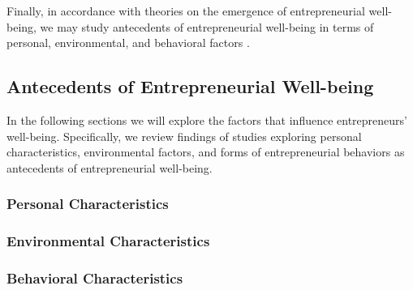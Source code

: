 \documentclass[a4paper,man,noextraspace,natbib]{apa6}
\begin{document}
Finally, in accordance with theories on the emergence of entrepreneurial well-being, we may study antecedents of entrepreneurial well-being in terms of personal, environmental, and behavioral factors \citep{Diener2002}.

\subsection{Antecedents of Entrepreneurial Well-being}
In the following sections we will explore the factors that influence entrepreneurs' well-being. Specifically, we review findings of studies exploring personal characteristics, environmental factors, and forms of entrepreneurial behaviors as antecedents of entrepreneurial well-being. 

\subsubsection{Personal Characteristics}



\subsubsection{Environmental Characteristics}

\subsubsection{Behavioral Characteristics}
\end{document}
